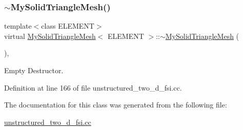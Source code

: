 \mbox{\label{classMySolidTriangleMesh_a46ef4b04ede9bdeb053c25dbb742806a}} 
\subsubsection{\texorpdfstring{$\sim$\+My\+Solid\+Triangle\+Mesh()}{~MySolidTriangleMesh()}}
{\footnotesize\ttfamily template$<$class E\+L\+E\+M\+E\+NT$>$ \\
virtual \hyperlink{classMySolidTriangleMesh}{My\+Solid\+Triangle\+Mesh}$<$ E\+L\+E\+M\+E\+NT $>$\+::$\sim$\hyperlink{classMySolidTriangleMesh}{My\+Solid\+Triangle\+Mesh} (\begin{DoxyParamCaption}{ }\end{DoxyParamCaption})\hspace{0.3cm}{\ttfamily [inline]}, {\ttfamily [virtual]}}



Empty Destructor. 



Definition at line 166 of file unstructured\+\_\+two\+\_\+d\+\_\+fsi.\+cc.



The documentation for this class was generated from the following file\+:\begin{DoxyCompactItemize}
\item 
\hyperlink{unstructured__two__d__fsi_8cc}{unstructured\+\_\+two\+\_\+d\+\_\+fsi.\+cc}\end{DoxyCompactItemize}
